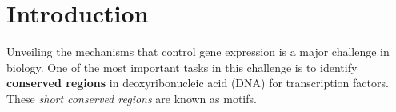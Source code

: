 \section{Introduction}
\label{sec:intro}
Unveiling the mechanisms that control gene expression is a major challenge in biology. One of the most important tasks in this challenge is to identify \textbf{conserved regions} in deoxyribonucleic acid (DNA) for transcription factors. These \textit{short conserved regions} are known as motifs.